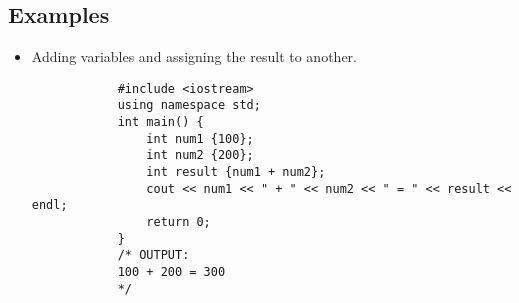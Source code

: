 \subsection{Examples}
\begin{itemize}
    \item Adding variables and assigning the result to another.
        \begin{verbatim}
            #include <iostream>
            using namespace std;
            int main() {
                int num1 {100};
                int num2 {200};
                int result {num1 + num2};
                cout << num1 << " + " << num2 << " = " << result << endl;
                return 0;
            }
            /* OUTPUT:
            100 + 200 = 300
            */
        \end{verbatim}
    

\end{itemize}
